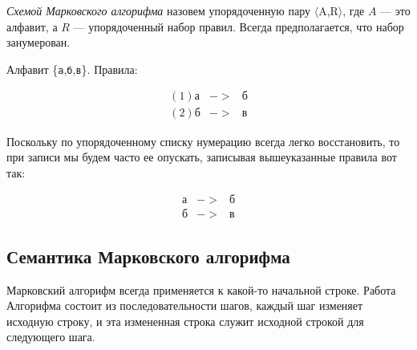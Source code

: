 \documentclass[12pt,a4paper,oneside]{article}
\newcommand{\s}[1]{\texttt{#1}}
\begin{document}
\begin{definition} \emph{Схемой Марковского алгорифма}
назовем упорядоченную пару $\langle$A,R$\rangle$, где $A$ --- это алфавит, 
а $R$ --- упорядоченный набор правил. Всегда предполагается, что набор 
занумерован.
\end{definition}

\begin{example} Алфавит \{\s{а},\s{б},\s{в}\}. Правила:
\begin{bnf}
  \begin{eqnarray*}
   (1) \s{а}&->&\s{б}\\
   (2) \s{б}&->&\s{в}
\end{eqnarray*}\end{bnf}
\end{example}

Поскольку по упорядоченному списку нумерацию всегда легко 
восстановить, то при записи мы будем часто ее опускать, записывая
вышеуказанные правила вот так:

\begin{bnf}\begin{eqnarray*}
   \s{а}&->&\s{б}\\
   \s{б}&->&\s{в}
\end{eqnarray*}\end{bnf}  

\subsection{Семантика Марковского алгорифма}

Марковский алгорифм всегда применяется к какой-то начальной строке. 
Работа Алгорифма состоит из последовательности шагов, каждый шаг 
изменяет исходную строку, и эта измененная строка служит исходной строкой 
для следующего шага.
\end{document}
